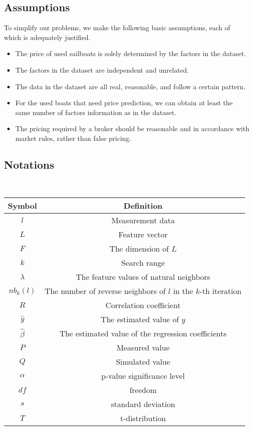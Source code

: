 \documentclass[12pt]{article}  %
\begin{document}
\subsection{Assumptions}
To simplify our problems, we make the following basic assumptions, each of which is
adequately justified.
\begin{itemize}
    \item The price of used sailboats is solely determined by the factors in the dataset.
    \item The factors in the dataset are independent and unrelated.
    \item The data in the dataset are all real, reasonable, and follow a certain pattern.
    \item For the used boats that need price prediction, we can obtain at least the same number of factors information as in the dataset.
    \item The pricing required by a broker should be reasonable and in accordance with market rules, rather than false pricing.
\end{itemize}
\subsection{Notations}
\ 
\begin{table}[!htbp]
\begin{center}
\begin{tabular}{cc}
	\toprule

	Symbol& Definition\\
	\midrule
	$l$ &Measurement data\\
    \hline
	$L$ &Feature vector\\
    \hline
	$F$ &The dimension of $L$\\
    \hline
    $k$ &Search range\\
    \hline
    $\lambda$ & The feature values of natural neighbors\\
    \hline
    $nb_k(l)$ & The number of reverse neighbors of $l$ in the $k$-th iteration\\
    \hline
    $R$ & Correlation coefficient\\
    \hline
    $\hat{y}$ & The estimated value of $y$\\
    \hline
    $\hat{\beta}$ & The estimated value of the regression coefficients\\
    \hline
    $P$ & Measured value \\
    \hline
    $Q$ & Simulated value \\ 
    \hline
    $\alpha$ & p-value significance level \\
    \hline
    $df$ & freedom \\
    \hline
    $s$ & standard deviation \\
    \hline 
    $T$ & t-distribution \\

	\bottomrule
\end{tabular}
\end{center}
\end{table}
\end{document}
